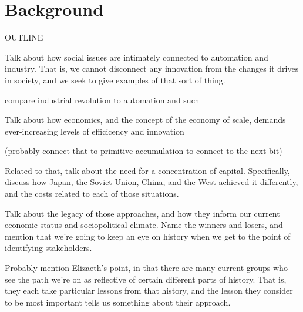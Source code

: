 \section{Background}
\label{sec:-background}
{\large OUTLINE}


Talk about how social issues are intimately connected to automation 
and industry.  That is, we cannot disconnect any innovation from the 
changes it drives in society, and we seek to give examples of that sort 
of thing.

compare industrial revolution to automation and such

Talk about how economics, and the concept of the economy of scale, 
demands ever-increasing levels of efficicency and innovation

(probably connect that to primitive accumulation to connect to the next bit)

Related to that, talk about the need for a concentration of capital.  
Specifically, discuss how Japan, the Soviet Union, China, and the 
West achieved it differently, and the costs related to each of those 
situations.

Talk about the legacy of those approaches, and how they inform our 
current economic status and sociopolitical climate.  Name the winners 
and losers, and mention that we're going to keep an eye on history when 
we get to the point of identifying stakeholders.  

Probably mention 
Elizaeth's point, in that there are many current groups who see the 
path we're on as reflective of certain different parts of history.  
That is, they each take particular lessons from that history, and 
the lesson they consider to be most important tells us something 
about their approach.





